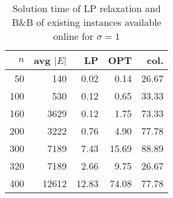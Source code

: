 \begin{table}[]
	\centering
\begin{tabular}{rrrrr}
$n$ & avg $|E|$ & LP  & OPT &  col. \\
\hline
  50 & 140  & 0.02&0.14 & 26.67\\
 100 & 530  & 0.12&0.65 & 33.33\\
 160 &3629  & 0.12&1.75 & 73.33\\
 200 &3222  & 0.76&4.90 & 77.78\\
 300 &7189  & 7.43&15.69& 88.89\\
 320 &7189  & 2.66& 9.75& 26.67\\
 400 &12612 &12.83&74.08& 77.78
\end{tabular}
\caption{Solution time of LP relaxation and B\&B of existing instances available online for $\sigma=1$}
\label{tab:soltime-exist}
\end{table}

